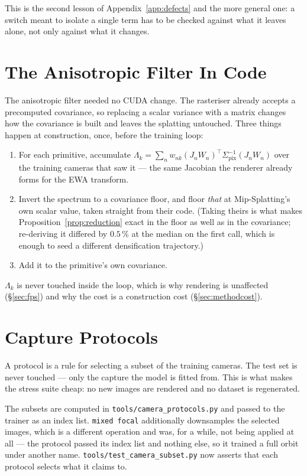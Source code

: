 This is the second lesson of Appendix~\ref{app:defects} and the more general one:
a switch meant to isolate a single term has to be checked against what it leaves
alone, not only against what it changes.

\section{The Anisotropic Filter In Code}

The anisotropic filter needed no CUDA change. The rasteriser already accepts a precomputed
covariance, so replacing a scalar variance with a matrix changes how the covariance is built
and leaves the splatting untouched. Three things happen at
construction, once, before the training loop:

\begin{enumerate}[leftmargin=1.4em,itemsep=2pt]
  \item For each primitive, accumulate
        $\Lambda_k = \sum_n w_{nk}(J_nW_n)^{\!\top}\Sigma_{\mathrm{pix}}^{-1}(J_nW_n)$
        over the training cameras that saw it --- the same Jacobian the renderer
        already forms for the EWA transform.
  \item Invert the spectrum to a covariance floor, and floor \emph{that} at
        Mip-Splatting's own scalar value, taken straight from their code.
        (Taking theirs is what makes Proposition~\ref{prop:reduction} exact in the
        floor as well as in the covariance; re-deriving it differed by $0.5\,\%$
        at the median on the first call, which is enough to seed a different
        densification trajectory.)
  \item Add it to the primitive's own covariance.
\end{enumerate}

$\Lambda_k$ is never touched inside the loop, which is why rendering is
unaffected (\S\ref{sec:fps}) and why the cost is a construction cost
(\S\ref{sec:methodcost}).

\section{Capture Protocols}

A protocol is a rule for selecting a subset of the training cameras. The test set
is never touched --- only the capture the model is fitted from. This is what makes
the stress suite cheap: no new images are rendered and no dataset is regenerated.

The subsets are computed in \texttt{tools/camera\_protocols.py} and passed to the
trainer as an index list. \texttt{mixed focal} additionally downsamples the
selected images, which is a different operation and was, for a while,
not being applied at all --- the protocol passed its index list and nothing else,
so it trained a full orbit under another name. \texttt{tools/test\_camera\_subset.py}
now asserts that each protocol selects what it claims to.
